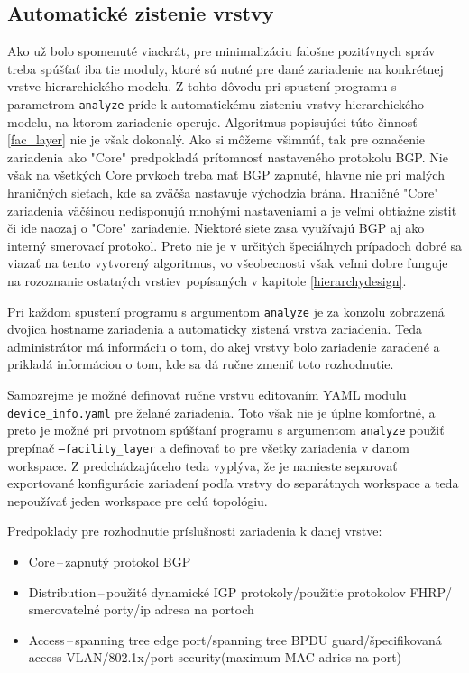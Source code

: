 \newpage
\subsection{Automatické zistenie vrstvy}
\label{automatic_faclayer}

Ako už bolo spomenuté viackrát, pre minimalizáciu falošne pozitívnych správ treba spúšťať iba tie moduly, ktoré sú nutné pre dané zariadenie na konkrétnej vrstve hierarchického modelu. Z tohto dôvodu pri spustení programu s parametrom \texttt{analyze} príde k automatickému zisteniu vrstvy hierarchického modelu, na ktorom zariadenie operuje. Algoritmus popisujúci túto činnosť \ref{fac_layer} nie je však dokonalý. Ako si môžeme všimnúť, tak pre označenie zariadenia ako "Core" predpokladá prítomnosť nastaveného protokolu BGP. Nie však na všetkých Core prvkoch treba mať BGP zapnuté, hlavne nie pri malých hraničných sieťach, kde sa zväčša nastavuje východzia brána. Hraničné "Core" zariadenia väčšinou nedisponujú mnohými nastaveniami a je veľmi obtiažne zistiť či ide naozaj o "Core" zariadenie. Niektoré siete zasa využívajú BGP aj ako interný smerovací protokol. Preto nie je v určitých špeciálnych prípadoch dobré sa viazať na tento vytvorený algoritmus, vo všeobecnosti však veľmi dobre funguje na rozoznanie ostatných vrstiev popísaných v kapitole \ref{hierarchydesign}.

Pri každom spustení programu s argumentom \texttt{analyze} je za konzolu zobrazená dvojica hostname zariadenia a automaticky zistená vrstva zariadenia. Teda administrátor má informáciu o tom, do akej vrstvy bolo zariadenie zaradené a prikladá informáciou o tom, kde sa dá ručne zmeniť toto rozhodnutie. 

Samozrejme je možné definovať ručne vrstvu editovaním YAML modulu \texttt{device\_info.yaml} pre želané zariadenia. Toto však nie je úplne komfortné, a preto je možné pri prvotnom spúšťaní programu s argumentom \texttt{analyze} použiť prepínač \texttt{--facility\_layer} a definovať to pre všetky zariadenia v danom workspace. Z predchádzajúceho teda vyplýva, že je namieste separovať exportované konfigurácie zariadení podľa vrstvy do separátnych workspace a teda nepoužívať jeden workspace pre celú topológiu.  

\vspace{2em}
\noindent
Predpoklady pre rozhodnutie príslušnosti zariadenia k danej vrstve:
\begin{itemize}
	\item Core\,--\,zapnutý protokol BGP
	\item Distribution\,--\,použité dynamické IGP protokoly/použitie protokolov FHRP/ smerovatelné porty/ip adresa na portoch
	\item Access\,--\,spanning tree edge port/spanning tree BPDU guard/špecifikovaná access VLAN/802.1x/port security(maximum MAC adries na port) 
\end{itemize}


